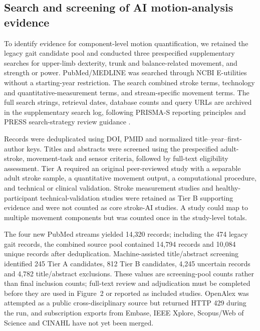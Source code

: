 \subsection{Search and screening of AI motion-analysis evidence}
\label{sec:ai_search_methods}

To identify evidence for component-level motion quantification, we retained the legacy gait candidate pool and conducted three prespecified supplementary searches for upper-limb dexterity, trunk and balance-related movement, and strength or power. PubMed/MEDLINE was searched through NCBI E-utilities without a starting-year restriction. The search combined stroke terms, technology and quantitative-measurement terms, and stream-specific movement terms. The full search strings, retrieval dates, database counts and query URLs are archived in the supplementary search log, following PRISMA-S reporting principles and PRESS search-strategy review guidance \cite{Rethlefsen2021PRISMAS,McGowan2016PRESS}.

Records were deduplicated using DOI, PMID and normalized title--year--first-author keys. Titles and abstracts were screened using the prespecified adult-stroke, movement-task and sensor criteria, followed by full-text eligibility assessment. Tier A required an original peer-reviewed study with a separable adult stroke sample, a quantitative movement output, a computational procedure, and technical or clinical validation. Stroke measurement studies and healthy-participant technical-validation studies were retained as Tier B supporting evidence and were not counted as core stroke-AI studies. A study could map to multiple movement components but was counted once in the study-level totals.

The four new PubMed streams yielded 14,320 records; including the 474 legacy gait records, the combined source pool contained 14,794 records and 10,084 unique records after deduplication. Machine-assisted title/abstract screening identified 245 Tier A candidates, 812 Tier B candidates, 4,245 uncertain records and 4,782 title/abstract exclusions. These values are screening-pool counts rather than final inclusion counts; full-text review and adjudication must be completed before they are used in Figure~2 or reported as included studies. OpenAlex was attempted as a public cross-disciplinary source but returned HTTP 429 during the run, and subscription exports from Embase, IEEE Xplore, Scopus/Web of Science and CINAHL have not yet been merged.
